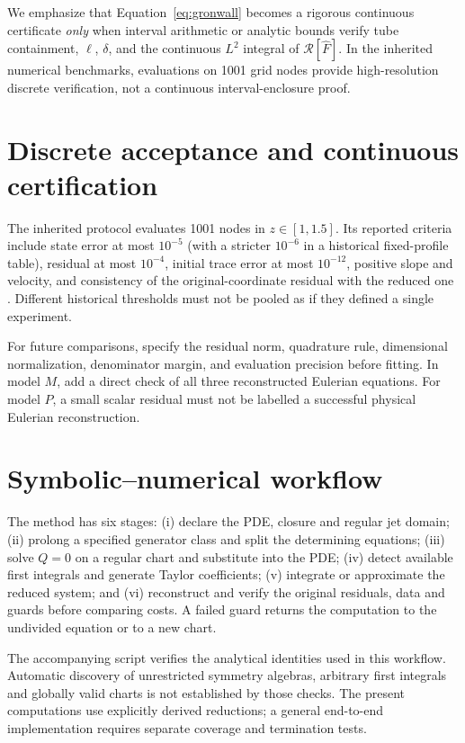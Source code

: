 \documentclass[11pt,a4paper,oneside]{report}
\numberwithin{equation}{chapter}
\newcommand{\R}{\mathcal R}
\begin{document}
We emphasize that Equation~\eqref{eq:gronwall} becomes a rigorous continuous certificate \emph{only} when interval arithmetic or analytic bounds verify tube containment, $\ell$, $\delta$, and the continuous $L^2$ integral of $\R[\widehat{F}]$. In the inherited numerical benchmarks, evaluations on 1001 grid nodes provide high-resolution discrete verification, not a continuous interval-enclosure proof.



\section{Discrete acceptance and continuous certification}
The inherited protocol evaluates 1001 nodes in $z\in[1,1.5]$. Its reported criteria include state error at most $10^{-5}$ (with a stricter $10^{-6}$ in a historical fixed-profile table), residual at most $10^{-4}$, initial trace error at most $10^{-12}$, positive slope and velocity, and consistency of the original-coordinate residual with the reduced one \cite{projectdraft}. Different historical thresholds must not be pooled as if they defined a single experiment.

For future comparisons, specify the residual norm, quadrature rule, dimensional normalization, denominator margin, and evaluation precision before fitting. In model $M$, add a direct check of all three reconstructed Eulerian equations. For model $P$, a small scalar residual must not be labelled a successful physical Eulerian reconstruction.





\section{Symbolic--numerical workflow}
The method has six stages: (i) declare the PDE, closure and regular jet domain; (ii) prolong a specified generator class and split the determining equations; (iii) solve $Q=0$ on a regular chart and substitute into the PDE; (iv) detect available first integrals and generate Taylor coefficients; (v) integrate or approximate the reduced system; and (vi) reconstruct and verify the original residuals, data and guards before comparing costs. A failed guard returns the computation to the undivided equation or to a new chart.

The accompanying script verifies the analytical identities used in this workflow. Automatic discovery of unrestricted symmetry algebras, arbitrary first integrals and globally valid charts is not established by those checks. The present computations use explicitly derived reductions; a general end-to-end implementation requires separate coverage and termination tests.
\end{document}
